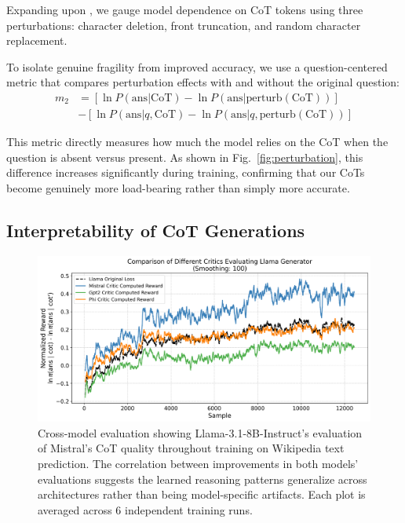 \documentclass{article}
\begin{document}
Expanding upon \citet{lanham2023measuring}, we gauge model dependence on CoT tokens using three perturbations: character deletion, front truncation, and random character replacement.
    
To isolate genuine fragility from improved accuracy, we use a question-centered metric that compares perturbation effects with and without the original question:
\begin{align}
m_2 &= [\ln P(\text{ans}|\text{CoT}) - \ln P(\text{ans}|\text{perturb}(\text{CoT}))] \nonumber\\
&- [\ln P(\text{ans}|q, \text{CoT}) - \ln P(\text{ans}|q, \text{perturb}(\text{CoT}))]
\end{align}

This metric directly measures how much the model relies on the CoT when the question is absent versus present. As shown in Fig.~\ref{fig:perturbation}, this difference increases significantly during training, confirming that our CoTs become genuinely more load-bearing rather than simply more accurate.

\subsection{Interpretability of CoT Generations}
\label{subsec:interp}

\begin{figure}[ht]
  \centering
  \includegraphics[width=.9\textwidth]{Figures/wiki_multi_critic_comparison.png}
  \caption{Cross-model evaluation showing Llama-3.1-8B-Instruct's evaluation of Mistral's CoT quality throughout training on Wikipedia text prediction. The correlation between improvements in both models' evaluations suggests the learned reasoning patterns generalize across architectures rather than being model-specific artifacts. Each plot is averaged across 6 independent training runs.}
  \label{fig:cross_eval}
\end{figure}
\end{document}
